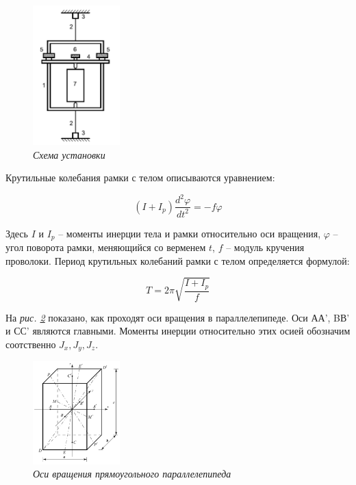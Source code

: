 \documentclass[a4paper, 12pt]{article}
\begin{document}
\begin{figure}[h!]
        \centering
	\includegraphics[width=0.3\textwidth]{ustan.png}
	\caption{\textit{Схема установки}}
	\label{ustan}
\end{figure}

Крутильные колебания рамки с телом описываются уравнением:

\begin{equation}
    \left( I + I_{p} \right) \frac{d^2 \varphi}{dt^2} = - f \varphi
\end{equation}

Здесь $I$ и $I_{p}$ -- моменты инерции тела и рамки относительно оси вращения, $\varphi$ -- угол поворота рамки, меняющийся со верменем $t$, $f$ -- модуль кручения проволоки. Период крутильных
 колебаний рамки с телом определяется формулой:
 
\begin{equation}
    T = 2\pi\sqrt{\frac{I+I_{p}}{f}}
\end{equation}

На \textit{рис.  \ref{cube}} показано, как проходят оси вращения в параллелепипеде.
 Оси АА', BВ' и СС' являются главными. Моменты инерции относительно
этих осией обозначим соотственно $J_{x}, J_{y}, J_{z}$.\\

\begin{figure}[h!]
        \centering
	\includegraphics[width=0.3\textwidth]{cube.png}
	\caption{\textit{Оси вращения прямоугольного параллелепипеда}}
	\label{cube}
\end{figure}
\end{document}
